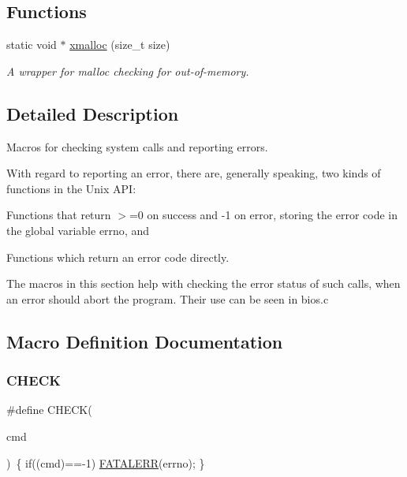 \subsection*{Functions}
\begin{DoxyCompactItemize}
\item 
static void $\ast$ \hyperlink{group__check__macros_ga1d16f442903359e8146370c52297334c}{xmalloc} (size\+\_\+t size)
\begin{DoxyCompactList}\small\item\em A wrapper for malloc checking for out-\/of-\/memory. \end{DoxyCompactList}\end{DoxyCompactItemize}


\subsection{Detailed Description}
Macros for checking system calls and reporting errors. 

With regard to reporting an error, there are, generally speaking, two kinds of functions in the Unix A\+PI\+:
\begin{DoxyEnumerate}
\item Functions that return $>$=0 on success and -\/1 on error, storing the error code in the global variable {\ttfamily errno}, and
\item Functions which return an error code directly.
\end{DoxyEnumerate}

The macros in this section help with checking the error status of such calls, when an error should abort the program. Their use can be seen in bios.\+c 

\subsection{Macro Definition Documentation}
\mbox{\label{group__check__macros_ga1992445028206dcca9c93c9a0b558436}} 
\subsubsection{\texorpdfstring{C\+H\+E\+CK}{CHECK}}
{\footnotesize\ttfamily \#define C\+H\+E\+CK(\begin{DoxyParamCaption}\item[{}]{cmd }\end{DoxyParamCaption})~\{ if((cmd)==-\/1) \hyperlink{group__check__macros_gab2b3925a76d34a1272ace73af5a81945}{F\+A\+T\+A\+L\+E\+RR}(errno); \}}



